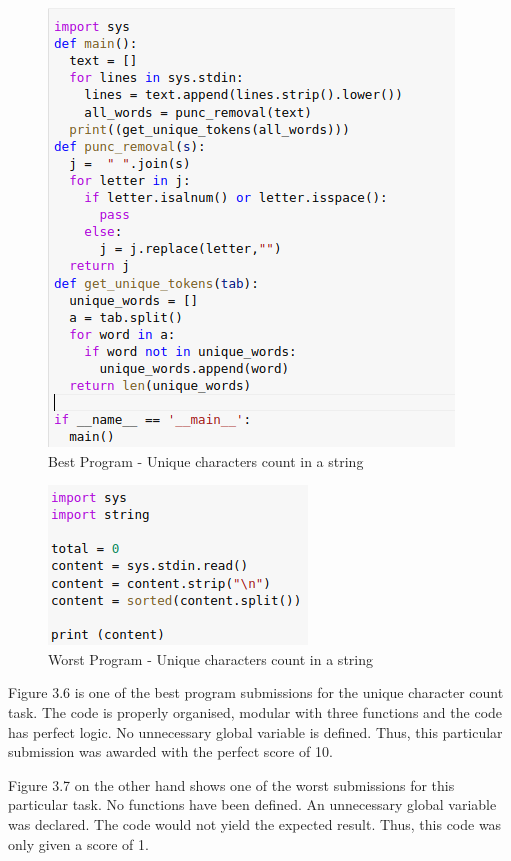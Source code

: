 \begin{figure}[h]
\centering
\includegraphics{./figures/best_uc.png}
\caption{Best Program - Unique characters count in a string}
\label{fig1}
\end{figure}

\newpage

\begin{figure}[H]
\centering
\includegraphics{./figures/worst_uc.png}
\caption{Worst Program - Unique characters count in a string}
\label{fig1}
\end{figure}

Figure 3.6 is one of the best program submissions for the
unique character count task. The code is properly organised,
modular with three functions and the code has perfect
logic. No unnecessary global variable is defined. Thus, this
particular submission was awarded with the perfect score of
10.

Figure 3.7 on the other hand shows one of the worst
submissions for this particular task. No functions have been
defined. An unnecessary global variable was declared. The
code would not yield the expected result. Thus, this code was
only given a score of 1.


